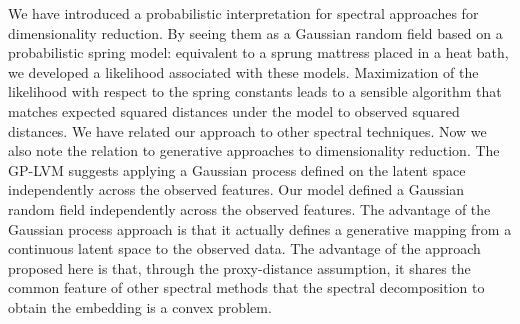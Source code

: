 We have introduced a probabilistic interpretation for spectral approaches for dimensionality reduction. By seeing them as a Gaussian random field based on a probabilistic spring model: equivalent to a sprung mattress placed in a heat bath, we developed a likelihood associated with these models. Maximization of the likelihood with respect to the spring constants leads to a sensible algorithm that matches expected squared distances under the model to observed squared distances. 
We have related our approach to other spectral techniques. Now we also note the relation to generative approaches to dimensionality reduction. The GP-LVM \citep{Lawrence:pnpca05} suggests applying a Gaussian process defined on the latent space independently across the observed features. Our model defined a Gaussian random field independently across the observed features. The advantage of the Gaussian process approach is that it actually defines a generative mapping from a continuous latent space to the observed data. The advantage of the approach proposed here is that, through the proxy-distance assumption, it shares the common feature of other spectral methods that the spectral decomposition to obtain the embedding is a convex problem. 



